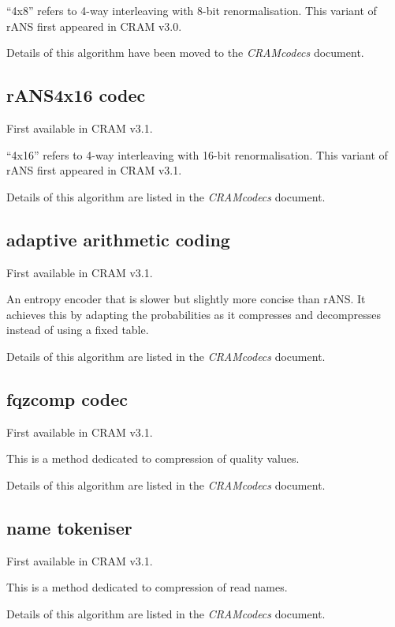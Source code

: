 \documentclass[a4paper]{article}
\begin{document}
``4x8'' refers to 4-way interleaving with 8-bit renormalisation.\newline
This variant of rANS first appeared in CRAM v3.0.

Details of this algorithm have been moved to the \textit{CRAMcodecs} document.

\subsection{\textbf{rANS4x16 codec}}

First available in CRAM v3.1.

``4x16'' refers to 4-way interleaving with 16-bit renormalisation.\newline
This variant of rANS first appeared in CRAM v3.1.

Details of this algorithm are listed in the \textit{CRAMcodecs} document.

\subsection{\textbf{adaptive arithmetic coding}}

First available in CRAM v3.1.

An entropy encoder that is slower but slightly more concise than
rANS.  It achieves this by adapting the probabilities as it compresses
and decompresses instead of using a fixed table.

Details of this algorithm are listed in the \textit{CRAMcodecs} document.

\subsection{\textbf{fqzcomp codec}}

First available in CRAM v3.1.

This is a method dedicated to compression of quality values.

Details of this algorithm are listed in the \textit{CRAMcodecs} document.

\subsection{\textbf{name tokeniser}}

First available in CRAM v3.1.

This is a method dedicated to compression of read names.

Details of this algorithm are listed in the \textit{CRAMcodecs} document.
\end{document}
